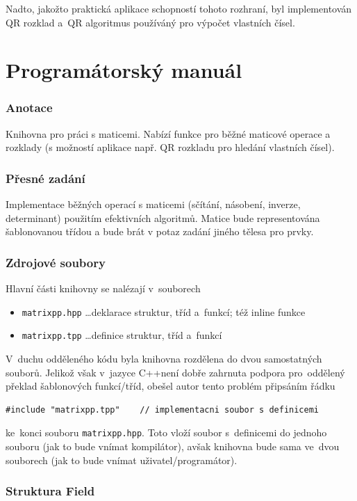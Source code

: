 \documentclass[11pt,a4paper]{article}
\newcommand{\cpp}{\textsc{C++}}
\theoremstyle{remark}
\begin{document}
Nadto, jakožto praktická aplikace schopností tohoto rozhraní, byl implementován
QR rozklad a~QR algoritmus používáný pro výpočet vlastních čísel.

\pagebreak

\part{Programátorský manuál}
\section{Anotace}
Knihovna pro práci s maticemi.
Nabízí funkce pro běžné maticové operace a rozklady (s možností aplikace např.
QR rozkladu pro hledání vlastních čísel).

\section{Přesné zadání}
Implementace běžných operací s maticemi (sčítání, násobení, inverze,
determinant) použitím efektivních algoritmů. 
Matice bude representována ša\-blo\-no\-va\-nou třídou a bude brát v potaz
zadání jiného tělesa pro prvky.

\section{Zdrojové soubory}
Hlavní části knihovny se nalézají v~souborech
\begin{itemize}
  \item \verb=matrixpp.hpp= \ldots deklarace struktur, tříd a~funkcí; též
    inline funkce
  \item \verb=matrixpp.tpp= \ldots definice struktur, tříd a~funkcí
\end{itemize}
V~duchu odděleného kódu byla knihovna rozdělena do dvou samostatných souborů.
Jelikož však v~jazyce \cpp není dobře zahrnuta podpora
pro~od\-dě\-le\-ný překlad šablonových funkcí/tříd,
obešel autor tento problém připsáním řádku
\begin{verbatim}
#include "matrixpp.tpp"    // implementacni soubor s definicemi
\end{verbatim}
ke~konci souboru \verb=matrixpp.hpp=.
Toto vloží soubor s~definicemi do jednoho souboru (jak to bude vnímat
kompilátor), avšak knihovna bude sama ve~dvou souborech (jak to bude vnímat
uživatel/programátor).

\section{Struktura Field}
\end{document}
